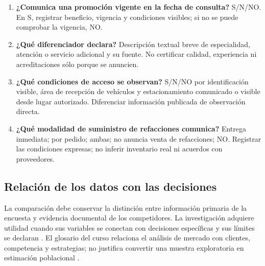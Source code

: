 {\begin{enumerate}
\item[O13.] \textbf{¿Comunica una promoción vigente en la fecha de consulta?} S/N/NO. En S, registrar beneficio, vigencia y condiciones visibles; si no se puede comprobar la vigencia, NO.
\item[O14.] \textbf{¿Qué diferenciador declara?} Descripción textual breve de especialidad, atención o servicio adicional y su fuente. No certificar calidad, experiencia ni acreditaciones sólo porque se anuncien.
\item[O15.] \textbf{¿Qué condiciones de acceso se observan?} S/N/NO por identificación visible, área de recepción de vehículos y estacionamiento comunicado o visible desde lugar autorizado. Diferenciar información publicada de observación directa.
\item[O16.] \textbf{¿Qué modalidad de suministro de refacciones comunica?} Entrega inmediata; por pedido; ambas; no anuncia venta de refacciones; NO. Registrar las condiciones expresas; no inferir inventario real ni acuerdos con proveedores.
\end{enumerate}

\clearpage
\subsection{Relación de los datos con las decisiones}
La comparación debe conservar la distinción entre información primaria de la encuesta y evidencia documental de los competidores. La investigación adquiere utilidad cuando sus variables se conectan con decisiones específicas y sus límites se declaran \citep{albrechtMarketing2023}. El glosario del curso relaciona el análisis de mercado con clientes, competencia y estrategias; no justifica convertir una muestra exploratoria en estimación poblacional \citep{planNegociosGlosario2024}.

}
